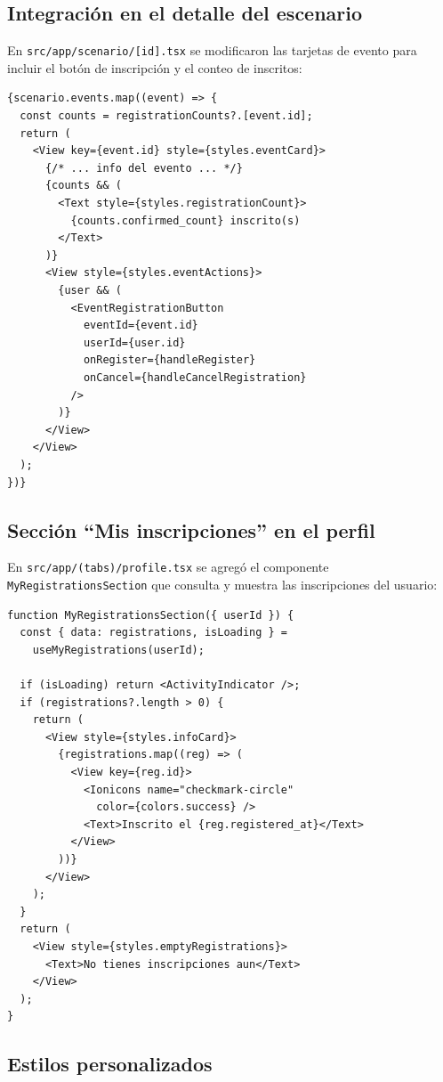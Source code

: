 \documentclass[12pt,letterpaper]{article}
\begin{document}
\subsection{Integraci\'on en el detalle del escenario}

En \texttt{src/app/scenario/[id].tsx} se modificaron las tarjetas de
evento para incluir el bot\'on de inscripci\'on y el conteo de
inscritos:

\begin{verbatim}
{scenario.events.map((event) => {
  const counts = registrationCounts?.[event.id];
  return (
    <View key={event.id} style={styles.eventCard}>
      {/* ... info del evento ... */}
      {counts && (
        <Text style={styles.registrationCount}>
          {counts.confirmed_count} inscrito(s)
        </Text>
      )}
      <View style={styles.eventActions}>
        {user && (
          <EventRegistrationButton
            eventId={event.id}
            userId={user.id}
            onRegister={handleRegister}
            onCancel={handleCancelRegistration}
          />
        )}
      </View>
    </View>
  );
})}
\end{verbatim}

\subsection{Secci\'on ``Mis inscripciones'' en el perfil}

En \texttt{src/app/(tabs)/profile.tsx} se agreg\'o el componente
\texttt{MyRegistrationsSection} que consulta y muestra las
inscripciones del usuario:

\begin{verbatim}
function MyRegistrationsSection({ userId }) {
  const { data: registrations, isLoading } =
    useMyRegistrations(userId);

  if (isLoading) return <ActivityIndicator />;
  if (registrations?.length > 0) {
    return (
      <View style={styles.infoCard}>
        {registrations.map((reg) => (
          <View key={reg.id}>
            <Ionicons name="checkmark-circle"
              color={colors.success} />
            <Text>Inscrito el {reg.registered_at}</Text>
          </View>
        ))}
      </View>
    );
  }
  return (
    <View style={styles.emptyRegistrations}>
      <Text>No tienes inscripciones aun</Text>
    </View>
  );
}
\end{verbatim}

\subsection{Estilos personalizados}
\end{document}
